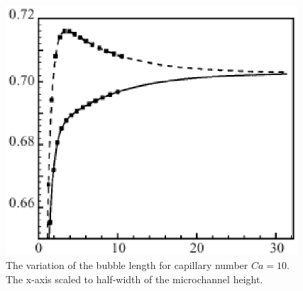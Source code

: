 \documentclass{article}
\begin{document}
\begin{figure}
\includegraphics[width=0.97\textwidth]{Figures/variationoverlength.eps}
\caption{The variation of the bubble length for capillary number $Ca=10$. The x-axis scaled to
half-width of the microchannel height.  \label{fig:thickness:variation:ca:ten}}
\end{figure}
\end{document}
